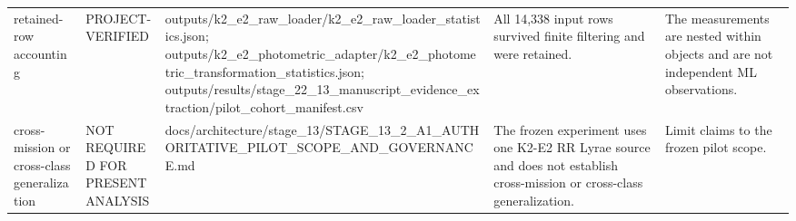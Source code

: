 \begin{longtable}{lllll}
retained-row accounting & PROJECT-VERIFIED & outputs/k2\_e2\_raw\_loader/k2\_e2\_raw\_loader\_statistics.json; outputs/k2\_e2\_photometric\_adapter/k2\_e2\_photometric\_transformation\_statistics.json; outputs/results/stage\_22\_13\_manuscript\_evidence\_extraction/pilot\_cohort\_manifest.csv & All 14,338 input rows survived finite filtering and were retained. & The measurements are nested within objects and are not independent ML observations. \\
cross-mission or cross-class generalization & NOT REQUIRED FOR PRESENT ANALYSIS & docs/architecture/stage\_13/STAGE\_13\_2\_A1\_AUTHORITATIVE\_PILOT\_SCOPE\_AND\_GOVERNANCE.md & The frozen experiment uses one K2-E2 RR Lyrae source and does not establish cross-mission or cross-class generalization. & Limit claims to the frozen pilot scope. \\
\bottomrule
\end{longtable}
